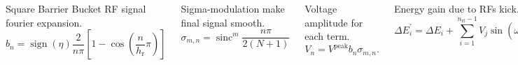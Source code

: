 \documentclass[25pt, a0paper, portrait, blockverticalspace=.5cm]{tikzposter}
\begin{document}
\begin{columns}
{\begin{minipage}{0.5\linewidth}
			\par Square Barrier Bucket RF signal fourier expansion.
			\begin{equation}
			b_n=\operatorname{sign}(\eta) \frac{2}{n \pi}\left[1-\cos \left(\frac{n}{h_{\mathrm{r}}} \pi\right)\right]
			\end{equation}
		 	\par Sigma-modulation make final signal smooth.
			\begin{equation}
			\sigma_{m, n}=\operatorname{sinc}^m \frac{n \pi}{2(N+1)}
			\end{equation}
		\end{minipage}
		\begin{minipage}{0.5\linewidth}
			\par Voltage amplitude for each term.
			\begin{equation}
			V_n=V^{\mathrm{peak}} b_{n} \sigma_{m, n}.
			\end{equation}
			\par Energy gain due to RFs kick. [1, 2]
			\begin{equation}
			\Delta E_i^{\prime}=\Delta E_i+\sum_{i=1}^{n_{\mathrm{rf}}-1} V_j \sin \left(\omega_j \Delta t_i+\phi_j\right)
			\end{equation}
		\end{minipage}
		

}
	
\end{columns}
\end{document}
